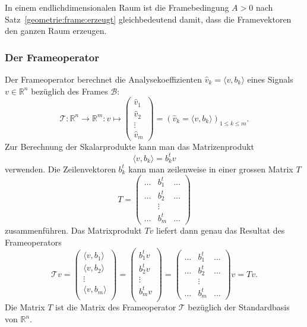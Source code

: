 In einem endlichdimensionalen Raum ist die Framebedingung $A>0$ 
nach Satz~\ref{geometrie:frame:erzeugt}
gleichbedeutend damit, dass die Framevektoren den ganzen Raum erzeugen.

\subsubsection{Der Frameoperator}
Der Frameoperator berechnet die Analysekoeffizienten
$\hat{v}_k=\langle v,b_k\rangle$ eines Signals
$v\in \mathbb R^n$ bezüglich des Frames $\mathcal{B}$:
\[
\mathcal{T}\colon \mathbb R^n \to \mathbb R^m
:
v \mapsto
\begin{pmatrix}
\hat{v}_1\\\hat{v}_2\\\vdots\\\hat{v}_m
\end{pmatrix}
=
(\hat{v}_k=\langle v,b_k\rangle)_{1\le k\le m}.
\]
Zur Berechnung der Skalarprodukte kann man das Matrizenprodukt
\[
\langle v,b_k\rangle
=
b_k^t v
\]
verwenden.
Die Zeilenvektoren $b_k^t$ kann man zeilenweise in einer grossen Matrix $T$
\[
T 
=
\begin{pmatrix}
\dots&b_1^t &\dots\\
\dots&b_2^t &\dots\\
     &\vdots&     \\
\dots&b_m^t &\dots
\end{pmatrix}
\]
zusammenführen.
Das Matrixprodukt $Tv$ liefert dann genau das Resultat des Frameoperators
\[
\mathcal{T} v
=
\begin{pmatrix}
\langle v, b_1\rangle\\
\langle v, b_2\rangle\\
\vdots\\
\langle v, b_m\rangle\\
\end{pmatrix}
=
\begin{pmatrix}
b_1^tv\\
b_2^tv\\
\vdots\\
b_m^tv\\
\end{pmatrix}
=
\begin{pmatrix}
\dots&b_1^t &\dots\\
\dots&b_2^t &\dots\\
     &\vdots&     \\
\dots&b_m^t &\dots
\end{pmatrix}
v
=
Tv.
\]
Die Matrix $T$ ist die Matrix des Frameoperator $\mathcal T$ bezüglich der
Standardbasis von $\mathbb R^n$.

